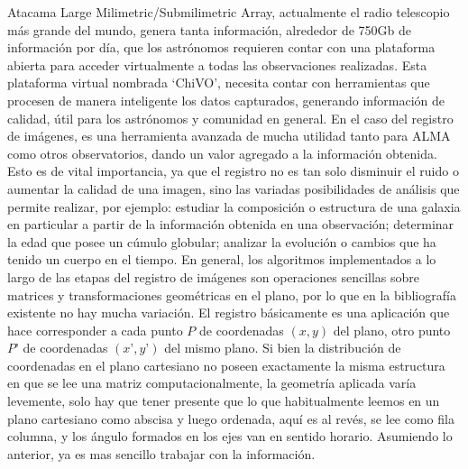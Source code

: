 Atacama Large Milimetric/Submilimetric Array, actualmente el radio
telescopio más grande del mundo, genera tanta información, alrededor
de 750Gb de información por día, que los astrónomos requieren contar
con una plataforma abierta para acceder virtualmente a todas las
observaciones realizadas. Esta plataforma virtual nombrada ‘ChiVO’,
necesita contar con herramientas que procesen de manera inteligente
los datos capturados, generando información de calidad, útil para los
astrónomos y comunidad en general. En el caso del registro de
imágenes, es una herramienta avanzada de mucha utilidad tanto para
ALMA como otros observatorios, dando un valor agregado a la
información obtenida. Esto es de vital importancia, ya que el registro
no es tan solo disminuir el ruido o aumentar la calidad de una imagen,
sino las variadas posibilidades de análisis que permite realizar, por
ejemplo: estudiar la composición o estructura de una galaxia en
particular a partir de la información obtenida en una observación;
determinar la edad que posee un cúmulo globular; analizar la
evolución o cambios que ha tenido un cuerpo en el tiempo. En general,
los algoritmos implementados a lo largo de las etapas del registro de
imágenes son operaciones sencillas sobre matrices y transformaciones
geométricas en el plano, por lo que en la bibliografía existente no
hay mucha variación. El registro básicamente es una aplicación que
hace corresponder a cada punto $P$ de coordenadas $(x,y)$ del plano,
otro punto $P’$ de coordenadas $(x’,y’)$ del mismo plano. Si bien la
distribución de coordenadas en el plano cartesiano no poseen
exactamente la misma estructura en que se lee una matriz
computacionalmente, la geometría aplicada varía levemente, solo hay
que tener presente que lo que habitualmente leemos en un plano
cartesiano como abscisa y luego ordenada, aquí es al revés, se lee
como fila columna, y los ángulo formados en los ejes van en sentido
horario. Asumiendo lo anterior, ya es mas sencillo trabajar con la
información.

